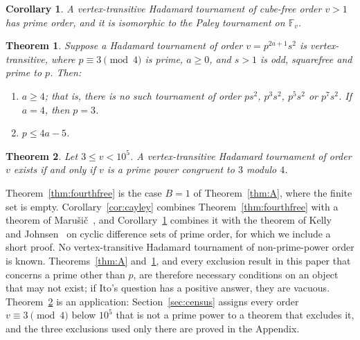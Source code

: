 \documentclass[11pt]{amsart}
\newtheorem{mainthm}{Theorem}
\newtheorem{corollary}[theorem]{Corollary}
\theoremstyle{definition}
\theoremstyle{remark}
\newcommand{\F}{\mathbb{F}}
\begin{document}
\begin{corollary}\label{cor:cubefree}
A vertex-transitive Hadamard tournament of cube-free order $v>1$ has prime order, and it is isomorphic to the Paley tournament on $\F_v$.
\end{corollary}

\begin{mainthm}\label{thm:C}
Suppose a Hadamard tournament of order $v=p^{2a+1}s^2$ is vertex-transitive, where $p\equiv3\pmod4$ is prime, $a\ge0$, and $s>1$ is odd, squarefree and prime to $p$. Then:
\begin{enumerate}
\item $a\ge4$; that is, there is no such tournament of order $ps^2$, $p^3s^2$, $p^5s^2$ or $p^7s^2$. If $a=4$, then $p=3$.
\item $p\le4a-5$.
\end{enumerate}
\end{mainthm}

\begin{mainthm}\label{thm:main}
Let $3\le v<10^5$. A vertex-transitive Hadamard tournament of order $v$ exists if and only if $v$ is a prime power congruent to $3$ modulo $4$.
\end{mainthm}

Theorem~\ref{thm:fourthfree} is the case $B=1$ of Theorem~\ref{thm:A}, where the finite set is empty. Corollary~\ref{cor:cayley} combines Theorem~\ref{thm:fourthfree} with a theorem of Maru\v{s}i\v{c}~\cite{Marusic}, and Corollary~\ref{cor:cubefree} combines it with the theorem of Kelly~\cite{Kelly} and Johnsen~\cite{Johnsen} on cyclic difference sets of prime order, for which we include a short proof. No vertex-transitive Hadamard tournament of non-prime-power order is known. Theorems~\ref{thm:A} and~\ref{thm:C}, and every exclusion result in this paper that concerns a prime other than $p$, are therefore necessary conditions on an object that may not exist; if Ito's question has a positive answer, they are vacuous. Theorem~\ref{thm:main} is an application: Section~\ref{sec:census} assigns every order $v\equiv3\pmod4$ below $10^5$ that is not a prime power to a theorem that excludes it, and the three exclusions used only there are proved in the Appendix.
\end{document}
